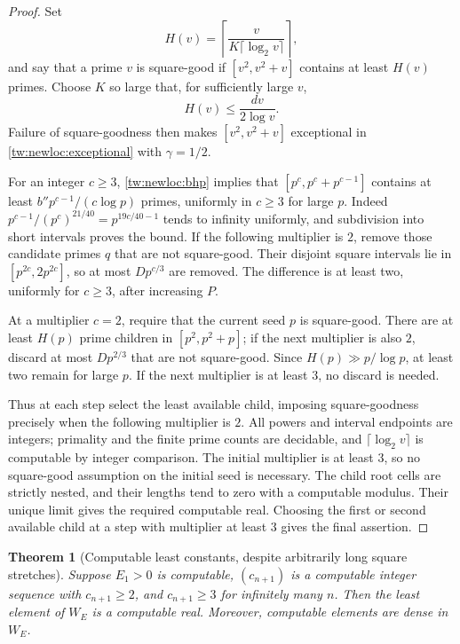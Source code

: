 \documentclass[11pt,a4paper]{article}
\newtheorem{theorem}{Theorem}[section]
\theoremstyle{definition}
\theoremstyle{remark}
\numberwithin{equation}{section}
\begin{document}
\begin{proof}
Set
\[
 H(v)=\left\lceil\frac{v}{K\lceil\log_2 v\rceil}\right\rceil,
\]
and say that a prime $v$ is square-good if $[v^2,v^2+v]$ contains at least
$H(v)$ primes. Choose $K$ so large that, for sufficiently large $v$,
\[
 H(v)\le\frac{d v}{2\log v}.
\]
Failure of square-goodness then makes $[v^2,v^2+v]$ exceptional in
\eqref{tw:newloc:exceptional} with $\gamma=1/2$.

For an integer $c\ge3$, \eqref{tw:newloc:bhp} implies that
$[p^c,p^c+p^{c-1}]$ contains at least
$b''p^{c-1}/(c\log p)$ primes, uniformly in $c\ge3$ for large $p$.
Indeed $p^{c-1}/(p^c)^{21/40}=p^{19c/40-1}$ tends to infinity uniformly,
and subdivision into short intervals proves the bound. If the following
multiplier is $2$, remove those candidate primes $q$ that are not
square-good. Their disjoint square intervals lie in $[p^{2c},2p^{2c}]$,
so at most $Dp^{c/3}$ are removed. The difference is at least two,
uniformly for $c\ge3$, after increasing $P$.

At a multiplier $c=2$, require that the current seed $p$ is square-good.
There are at least $H(p)$ prime children in $[p^2,p^2+p]$; if the next
multiplier is also $2$, discard at most $Dp^{2/3}$ that are not
square-good. Since $H(p)\gg p/\log p$, at least two remain for large $p$.
If the next multiplier is at least $3$, no discard is needed.

Thus at each step select the least available child, imposing
square-goodness precisely when the following multiplier is $2$.
All powers and interval endpoints are integers; primality and the finite
prime counts are decidable, and $\lceil\log_2v\rceil$ is computable by
integer comparison. The initial multiplier is at least $3$, so no
square-good assumption on the initial seed is necessary.
The child root cells are strictly nested, and their lengths tend to zero
with a computable modulus. Their unique limit gives the required
computable real. Choosing the first or second available child at a step
with multiplier at least $3$ gives the final assertion.
\end{proof}

\begin{theorem}[Computable least constants, despite arbitrarily long square stretches]
\label{tw:newloc:computableminimum}
Suppose $E_1>0$ is computable, $(c_{n+1})$ is a computable integer sequence
with $c_{n+1}\ge2$, and $c_{n+1}\ge3$ for infinitely many $n$. Then the
least element of $W_E$ is a computable real. Moreover, computable elements
are dense in $W_E$.
\end{theorem}
\end{document}
